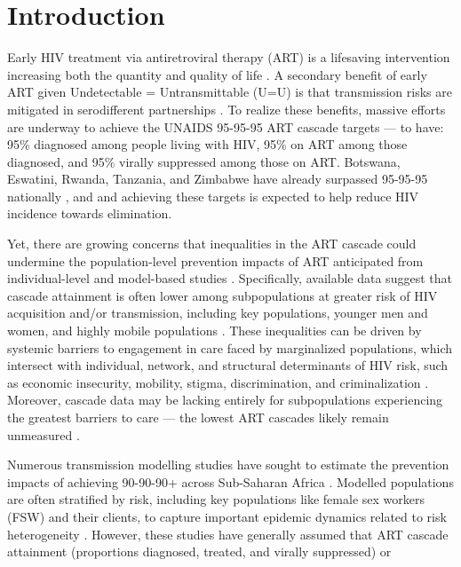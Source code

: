 \section{Introduction}\label{art.intro}
Early HIV treatment via antiretroviral therapy (ART) is a lifesaving intervention
increasing both the quantity and quality of life \cite{Lundgren2015init}.
A secondary benefit of early ART given Undetectable = Untransmittable (U=U) is that
transmission risks are mitigated in serodifferent partnerships \cite{Cohen2016}.
To realize these benefits, massive efforts are underway to achieve
the UNAIDS 95-95-95 ART cascade targets \cite{UNAIDS2023} --- \ie to have:
95\% diagnosed among people living with HIV,
95\% on ART among those diagnosed, and
95\% virally suppressed among those on ART.
Botswana, Eswatini, Rwanda, Tanzania, and Zimbabwe
have already surpassed 95-95-95 nationally \cite{UNAIDS2023}, and
and achieving these targets is expected to help reduce HIV incidence towards elimination.
\par
Yet, there are growing concerns that inequalities in the ART cascade
could undermine the population-level prevention impacts of ART
anticipated from individual-level and model-based studies
\cite{Baral2019,Green2020,Maheu-Giroux2024}.
Specifically, available data suggest that cascade attainment is often lower
among subpopulations at greater risk of HIV acquisition and/or transmission,
including key populations, younger men and women, and highly mobile populations
\cite{Hakim2018,Green2020}.
These inequalities can be driven by
systemic barriers to engagement in care faced by marginalized populations,
which intersect with individual, network, and structural determinants of HIV risk,
such as economic insecurity, mobility, stigma, discrimination, and criminalization
\cite{Lancaster2016sr,Wanyenze2016,Schwartz2017,Schmidt-Sane2022}.
Moreover, cascade data may be lacking entirely
for subpopulations experiencing the greatest barriers to care
--- \ie the lowest ART cascades likely remain unmeasured \cite{Hakim2018}.
\par
Numerous transmission modelling studies have sought to estimate
the prevention impacts of achieving 90-90-90+ across Sub-Saharan Africa
\cite{Eaton2012,Knight2022sr}.
Modelled populations are often stratified by risk,
including key populations like female sex workers (FSW) and their clients,
to capture important epidemic dynamics related to risk heterogeneity \cite{Watts2010}.
However, these studies have generally assumed that ART cascade
attainment (\ie proportions diagnosed, treated, and virally suppressed) or
